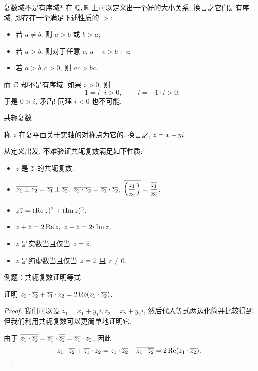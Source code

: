 \begin{frame}{复数域不是有序域*}
\onslide<+->
在 ${\mathbb{Q}},{\mathbb{R}}$ 上可以定义出一个好的大小关系,
\onslide<+->
换言之它们是有序域, 即存在一个满足下述性质的 $>$:
\begin{itemize}
\item 若 $a\neq b$, 则 $a>b$ 或 $b>a$;
\item 若 $a>b$, 则对于任意 $c$, $a+c>b+c$;
\item 若 $a>b,c>0$, 则 $ac>bc$.
\end{itemize}

\onslide<+->
而 ${\mathbb{C}}$ 却不是有序域.
\onslide<+->
如果 $i>0$, 则
\[-1=i\cdot i>0,\quad -i=-1\cdot i>0.\]
\onslide<+->
于是 $0>i$, 矛盾! 同理 $i<0$ 也不可能.
\end{frame}


\begin{frame}{共轭复数}
\begin{definition}
称 $z$ 在复平面关于实轴的对称点为它的.
换言之, $\overline z=x-yi$.
\end{definition}
\onslide<+->
从定义出发, 不难验证共轭复数满足如下性质:
\begin{conclusion}
\begin{itemize}
\item $z$ 是 $\overline z$ 的共轭复数.
\item $\ov{z_1\pm z_2}=\ov{z_1}\pm\ov{z_2},\ 
\ov{z_1\cdot z_2}=\ov{z_1}\cdot\ov{z_2},\ 
\ov{\left(\dfrac{z_1}{z_2}\right)}=\dfrac{\ov{z_1}}{\ov{z_2}}$.
\item $z\overline{z}=(\operatorname{Re} z)^2+(\operatorname{Im} z)^2$.
\item $z+\overline z=2\operatorname{Re} z,\ z-\overline z=2i\operatorname{Im} z$.
\item $z$ 是实数当且仅当 $z=\overline z$.
\item $z$ 是纯虚数当且仅当 $z=\overline z$ 且 $z\neq 0$.
\end{itemize}
\end{conclusion}
\end{frame}


\begin{frame}{例题：共轭复数证明等式}
\begin{example}
证明 $z_1\cdot\overline{z_2}+\overline{z_1}\cdot z_2=2\operatorname{Re}(z_1\cdot\overline{z_2})$.
\end{example}
\begin{proof}
\indent
我们可以设 $z_1=x_1+y_1i,z_2=x_2+y_2i$, 然后代入等式两边化简并比较得到.
\onslide<+->
但我们利用共轭复数可以更简单地证明它.

\indent
\onslide<+->
由于 $\overline{z_1\cdot\overline{z_2}}=\overline{z_1}\cdot\overline{\overline{z_2}}=\overline{z_1}\cdot z_2$, 
\onslide<+->
因此
\[z_1\cdot\overline{z_2}+\overline{z_1}\cdot z_2
=z_1\cdot\overline{z_2}+\overline{z_1\cdot\overline{z_2}}
=2\operatorname{Re}(z_1\cdot\overline{z_2}).\qedhere\]
\end{proof}
\end{frame}


